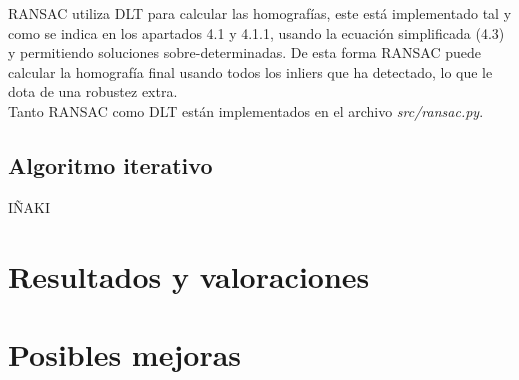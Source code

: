 RANSAC utiliza DLT para calcular las homografías, este está implementado tal y como se indica en los apartados 4.1 y 4.1.1, usando la ecuación simplificada (4.3) y permitiendo soluciones sobre-determinadas. De esta forma RANSAC puede calcular la homografía final usando todos los inliers que ha detectado, lo que le dota de una robustez extra.\\

Tanto RANSAC como DLT están implementados en el archivo \textit{src/ransac.py}.

\subsection{Algoritmo iterativo}
IÑAKI

\section{Resultados y valoraciones}

\section{Posibles mejoras}

\newpage
\nocite{*}



